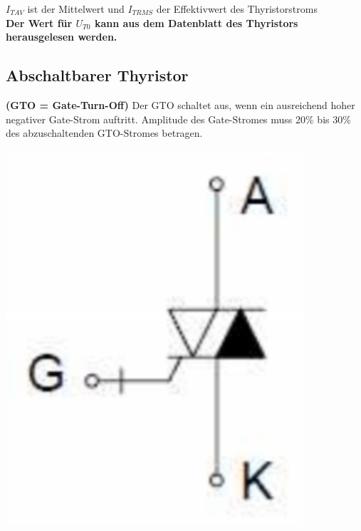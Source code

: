  $I_{T AV}$ ist der Mittelwert und $I_{T RMS}$ der Effektivwert des Thyristorstroms\\[0.2cm]
\textbf{Der Wert für $U_{T0}$ kann aus dem Datenblatt des Thyristors herausgelesen werden.}\\[0.2cm]

\begin{minipage}{0.5\linewidth}
    \subsection{Abschaltbarer Thyristor}
    \begin{minipage}{0.7\linewidth}        
        \textbf{(GTO = Gate-Turn-Off)}\newline
        Der GTO schaltet aus, wenn ein ausreichend hoher negativer Gate-Strom \newline auftritt.\newline
        Amplitude des Gate-Stromes muss 20\% bis 30\% des abzuschaltenden GTO-Stromes betragen.
    \end{minipage}
    \begin{minipage}{0.2\linewidth}
        \includegraphics[width=\linewidth]{images/GTOSymbol}
    \end{minipage}    
\end{minipage}

